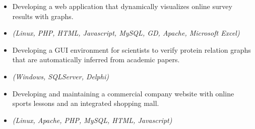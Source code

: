 \begin{itemize}
    \item{Developing a web application that dynamically visualizes online survey results with graphs.}
    \item{\it\small(Linux, PHP, HTML, Javascript, MySQL, GD, Apache, Microsoft Excel)}
\end{itemize}

\begin{itemize}
    \item {Developing a GUI environment for scientists to verify protein relation graphs
        that are automatically inferred from academic papers.}
    \item{\it\small(Windows, SQLServer, Delphi)}
\end{itemize}

\begin{itemize}
    \item{Developing and maintaining a commercial company website with
        online sports lessons and an integrated shopping mall.}
    \item{\it\small(Linux, Apache, PHP, MySQL, HTML, Javascript)}
\end{itemize}
